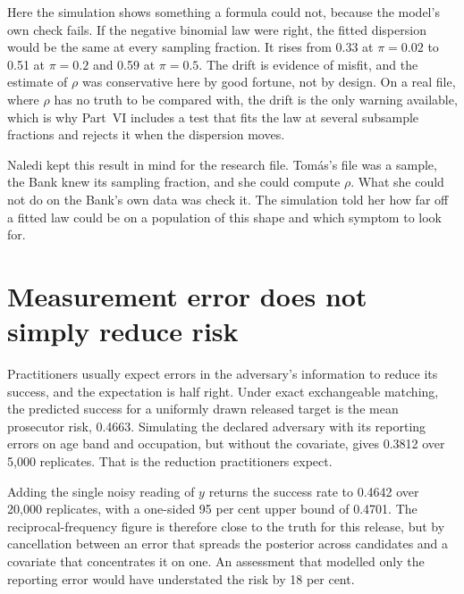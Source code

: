 Here the simulation shows something a formula could not, because the model's own
check fails. If the negative binomial law were right, the fitted dispersion would
be the same at every sampling fraction. It rises from 0.33 at $\pi = 0.02$ to 0.51
at $\pi = 0.2$ and 0.59 at $\pi = 0.5$.
The drift is evidence of misfit, and the estimate of $\rho$ was conservative here by
good fortune, not by design. On a real file, where $\rho$ has no truth to be compared
with, the drift is the only warning available, which is why Part~VI includes a test
that fits the law at several subsample fractions and rejects it when the dispersion
moves.

Naledi kept this result in mind for the research file. Tomás's file was a sample,
the Bank knew its sampling fraction, and she could compute $\rho$. What she could
not do on the Bank's own data was check it. The simulation told her how far off a
fitted law could be on a population of this shape and which symptom to look for.

\section{Measurement error does not simply reduce risk}

Practitioners usually expect errors in the adversary's information to reduce its
success, and the expectation is half right. Under exact exchangeable matching, the
predicted success for a uniformly drawn released target is the mean prosecutor risk,
0.4663. Simulating the declared adversary with its reporting errors on age band and
occupation, but without the covariate, gives 0.3812 over 5,000 replicates. That is
the reduction practitioners expect.

Adding the single noisy reading of $y$ returns the success rate to 0.4642 over
20,000 replicates, with a one-sided 95 per cent upper bound of 0.4701.
The reciprocal-frequency figure is therefore close to the truth for this release,
but by cancellation between an error that spreads the posterior across candidates
and a covariate that concentrates it on one. An assessment that modelled only the
reporting error would have understated the risk by 18 per cent.

